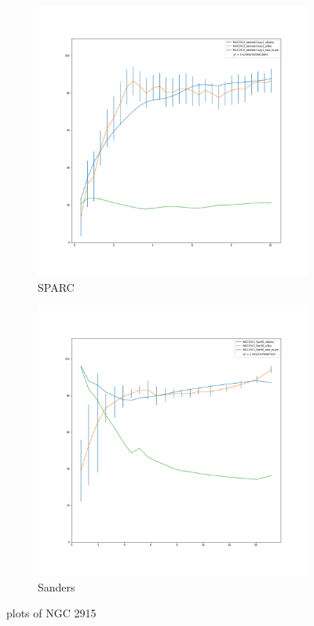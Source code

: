 \documentclass[reprint,%
 amsmath,amssymb,
 aps,
]{revtex4-1}
\begin{document}
  \begin{figure}[h]
\begin{subfigure}{.5\textwidth}
  \centering
  \includegraphics[width=.8\linewidth]{NGC2915_rotmod-Copy1_XueSofue.png}
  \caption{SPARC\cite{2016Lelli}}
  \label{fig:sfig17}
\end{subfigure}%
\begin{subfigure}{.5\textwidth}
  \centering
  \includegraphics[width=.8\linewidth]{NGC2915_San96_XueSofue.png}
  \caption{Sanders\cite{San96}}
  \label{fig:sfig18}
\end{subfigure}
\caption{plots of NGC 2915}
\label{fig:fig2915}
\end{figure}
\end{document}
